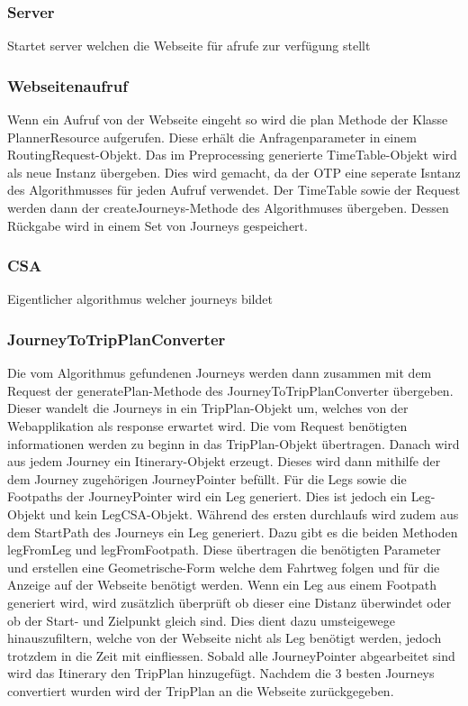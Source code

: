 \subsubsection{Server}
Startet server welchen die Webseite für afrufe zur verfügung stellt
\subsubsection{Webseitenaufruf}
Wenn ein Aufruf von der Webseite eingeht so wird die plan Methode der Klasse PlannerResource aufgerufen. Diese erhält die Anfragenparameter in einem RoutingRequest-Objekt. Das im Preprocessing generierte TimeTable-Objekt wird als neue Instanz übergeben. Dies wird gemacht, da der OTP eine seperate Isntanz des Algorithmusses für jeden Aufruf verwendet. Der TimeTable sowie der Request werden dann der createJourneys-Methode des Algorithmuses übergeben. Dessen Rückgabe wird in einem Set von Journeys gespeichert.

\subsubsection{CSA}
Eigentlicher algorithmus welcher journeys bildet
\subsubsection{JourneyToTripPlanConverter}
Die vom Algorithmus gefundenen Journeys werden dann zusammen mit dem Request der generatePlan-Methode des JourneyToTripPlanConverter übergeben. Dieser wandelt die Journeys in ein TripPlan-Objekt um, welches von der Webapplikation als response erwartet wird.
Die vom Request benötigten informationen werden zu beginn in das TripPlan-Objekt übertragen. Danach wird aus jedem Journey ein Itinerary-Objekt erzeugt. Dieses wird dann mithilfe der dem Journey zugehörigen JourneyPointer befüllt. Für die Legs sowie die Footpaths der JourneyPointer wird ein Leg generiert. Dies ist jedoch ein Leg-Objekt und kein LegCSA-Objekt. Während des ersten durchlaufs wird zudem aus dem StartPath des Journeys ein Leg generiert. Dazu gibt es die beiden Methoden legFromLeg und legFromFootpath. Diese übertragen die benötigten Parameter und erstellen eine Geometrische-Form welche dem Fahrtweg folgen und für die Anzeige auf der Webseite benötigt werden. Wenn ein Leg aus einem Footpath generiert wird, wird zusätzlich überprüft ob dieser eine Distanz überwindet oder ob der Start- und Zielpunkt gleich sind. Dies dient dazu umsteigewege hinauszufiltern, welche von der Webseite nicht als Leg benötigt werden, jedoch trotzdem in die Zeit mit einfliessen. Sobald alle JourneyPointer abgearbeitet sind wird das Itinerary den TripPlan hinzugefügt. Nachdem die 3 besten Journeys convertiert wurden wird der TripPlan an die Webseite zurückgegeben.
